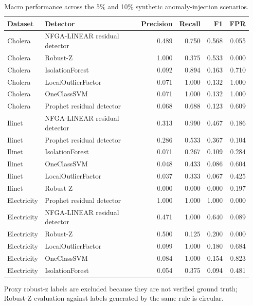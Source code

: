 \begin{table}[t]
\centering
\caption{Macro performance across the 5\% and 10\% synthetic anomaly-injection scenarios.}
\label{tab:detector_macro}
\begin{tabular}{llrrrr}
\toprule
Dataset & Detector & Precision & Recall & F1 & FPR \\
\midrule
Cholera & NFGA-LINEAR residual detector & 0.489 & 0.750 & 0.568 & 0.055 \\
Cholera & Robust-Z & 1.000 & 0.375 & 0.533 & 0.000 \\
Cholera & IsolationForest & 0.092 & 0.894 & 0.163 & 0.710 \\
Cholera & LocalOutlierFactor & 0.071 & 1.000 & 0.132 & 1.000 \\
Cholera & OneClassSVM & 0.071 & 1.000 & 0.132 & 1.000 \\
Cholera & Prophet residual detector & 0.068 & 0.688 & 0.123 & 0.609 \\
\midrule
Ilinet & NFGA-LINEAR residual detector & 0.313 & 0.990 & 0.467 & 0.186 \\
Ilinet & Prophet residual detector & 0.286 & 0.533 & 0.367 & 0.104 \\
Ilinet & IsolationForest & 0.071 & 0.267 & 0.109 & 0.284 \\
Ilinet & OneClassSVM & 0.048 & 0.433 & 0.086 & 0.604 \\
Ilinet & LocalOutlierFactor & 0.037 & 0.333 & 0.067 & 0.425 \\
Ilinet & Robust-Z & 0.000 & 0.000 & 0.000 & 0.197 \\
\midrule
Electricity & Prophet residual detector & 1.000 & 1.000 & 1.000 & 0.000 \\
Electricity & NFGA-LINEAR residual detector & 0.471 & 1.000 & 0.640 & 0.089 \\
Electricity & Robust-Z & 0.500 & 0.125 & 0.200 & 0.000 \\
Electricity & LocalOutlierFactor & 0.099 & 1.000 & 0.180 & 0.684 \\
Electricity & OneClassSVM & 0.084 & 1.000 & 0.154 & 0.823 \\
Electricity & IsolationForest & 0.054 & 0.375 & 0.094 & 0.481 \\
\midrule
\bottomrule
\end{tabular}
\begin{minipage}{0.98\linewidth}
\footnotesize Proxy robust-z labels are excluded because they are not verified ground truth; Robust-Z evaluation against labels generated by the same rule is circular.
\end{minipage}
\end{table}

